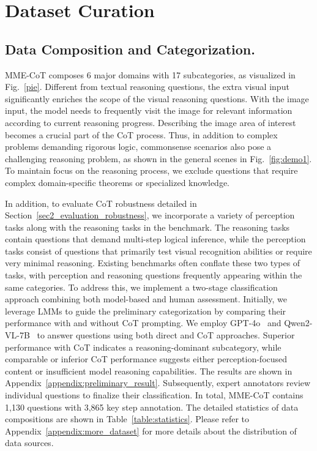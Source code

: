 \section{Dataset Curation}
\label{sec2_benchmark}

\subsection{Data Composition and Categorization.}
MME-CoT composes 6 major domains with 17 subcategories, as visualized in Fig.~\ref{pie}. Different from textual reasoning questions, the extra visual input significantly enriches the scope of the visual reasoning questions. 
With the image input, the model needs to frequently visit the image for relevant information according to current reasoning progress. Describing the image area of interest becomes a crucial part of the CoT process.
Thus, in addition to complex problems demanding rigorous logic, commonsense scenarios also pose a challenging reasoning problem,
as shown in the general scenes in Fig.~\ref{fig:demo1}. To maintain focus on the reasoning process, we exclude questions that require complex domain-specific theorems or specialized knowledge.

In addition, to evaluate CoT robustness detailed in Section~\ref{sec2_evaluation_robustness}, we incorporate a variety of perception tasks along with the reasoning tasks in the benchmark. 
The reasoning tasks contain questions that demand multi-step logical inference, while the perception tasks consist of questions that primarily test visual recognition abilities or require very minimal reasoning.
Existing benchmarks often conflate these two types of tasks, with perception and reasoning questions frequently appearing within the same categories. To address this, we implement a two-stage classification approach combining both model-based and human assessment. Initially, we leverage LMMs to guide the preliminary categorization by comparing their performance with and without CoT prompting. We employ GPT-4o~\cite{openai2024gpt4o} and Qwen2-VL-7B~\cite{wang2024qwen2} to answer questions using both direct and CoT approaches. Superior performance with CoT indicates a reasoning-dominant subcategory, while comparable or inferior CoT performance suggests either perception-focused content or insufficient model reasoning capabilities. The results are shown in Appendix~\ref{appendix:preliminary_result}. Subsequently, expert annotators review individual questions to finalize their classification. 
In total, MME-CoT contains 1,130 questions with 3,865 key step annotation. The detailed statistics of data compositions are shown in Table~\ref{table:statistics}. 
Please refer to Appendix~\ref{appendix:more_dataset} for more details about the distribution of data sources.


